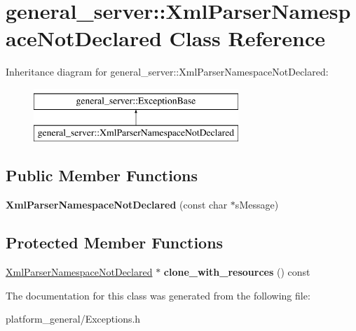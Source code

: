 \hypertarget{classgeneral__server_1_1XmlParserNamespaceNotDeclared}{\section{general\-\_\-server\-:\-:\-Xml\-Parser\-Namespace\-Not\-Declared \-Class \-Reference}
\label{classgeneral__server_1_1XmlParserNamespaceNotDeclared}
}
\-Inheritance diagram for general\-\_\-server\-:\-:\-Xml\-Parser\-Namespace\-Not\-Declared\-:\begin{figure}[H]
\begin{center}
\leavevmode
\includegraphics[height=2.000000cm]{classgeneral__server_1_1XmlParserNamespaceNotDeclared}
\end{center}
\end{figure}
\subsection*{\-Public \-Member \-Functions}
\begin{DoxyCompactItemize}
\item 
\hypertarget{classgeneral__server_1_1XmlParserNamespaceNotDeclared_a5ce794bf7f780ff0dd64fd5dd39eda55}{{\bfseries \-Xml\-Parser\-Namespace\-Not\-Declared} (const char $\ast$s\-Message)}\label{classgeneral__server_1_1XmlParserNamespaceNotDeclared_a5ce794bf7f780ff0dd64fd5dd39eda55}

\end{DoxyCompactItemize}
\subsection*{\-Protected \-Member \-Functions}
\begin{DoxyCompactItemize}
\item 
\hypertarget{classgeneral__server_1_1XmlParserNamespaceNotDeclared_a9584ae9befe0377cac3edb376b01b871}{\hyperlink{classgeneral__server_1_1XmlParserNamespaceNotDeclared}{\-Xml\-Parser\-Namespace\-Not\-Declared} $\ast$ {\bfseries clone\-\_\-with\-\_\-resources} () const }\label{classgeneral__server_1_1XmlParserNamespaceNotDeclared_a9584ae9befe0377cac3edb376b01b871}

\end{DoxyCompactItemize}


\-The documentation for this class was generated from the following file\-:\begin{DoxyCompactItemize}
\item 
platform\-\_\-general/\-Exceptions.\-h\end{DoxyCompactItemize}
